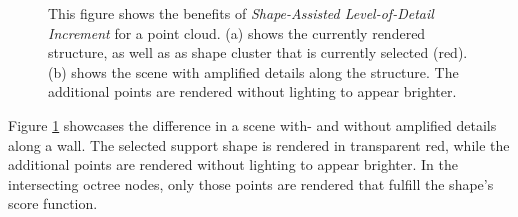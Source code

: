 \begin{figure}
\centering
{}\par\medskip
{}
\caption[Comparison of a scene with and without Shape-Assisted Level-of-Detail Increment.]
{This figure shows the benefits of \textit{Shape-Assisted Level-of-Detail Increment} for a point cloud. (a) shows the currently rendered structure, as well as as shape cluster that is currently selected (red). (b) shows the scene with amplified details along the structure. The additional points are rendered without lighting to appear brighter.}
\label{fig:lod_increment}
\end{figure}

Figure \ref{fig:lod_increment} showcases the difference in a scene with- and without amplified details along a wall. The selected support shape is rendered in transparent red, while the additional points are rendered without lighting to appear brighter. In the intersecting octree nodes, only those points are rendered that fulfill the shape's score function. 


